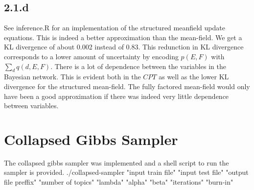 \documentclass{article}
\begin{document}
\subsection*{2.1.d}
See inference.R for an implementation of the structured meanfield
update equations. This is indeed a better approximation than the mean-field. We get a KL divergence of about 0.002 instead of 0.83. This redunction in KL divergence corresponds to a lower amount of uncertainty by encoding $p(E,F)$ with $\sum_{d} q(d,E,F)$. There is a lot of 
dependence between the variables in the Bayesian network. This
is evident both in the $CPT$ as well as the lower KL divergence for
the structured mean-field. The fully factored mean-field would only
have been a good approximation if there was indeed very little
dependence between variables.

\section*{Collapsed Gibbs Sampler}
The collapsed gibbs sampler was implemented and a shell script to run the sampler is provided.
./collapsed-sampler "input train file" "input test file" "output file preffix" "number of topics" "lambda" "alpha" "beta" "iterations" "burn-in"
\end{document}
